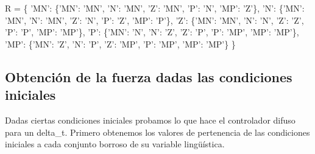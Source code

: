 \documentclass[onecolumn]{article}
\newenvironment{Shaded}{}{}
\newcommand{\NormalTok}[1]{#1}
\newcommand{\OperatorTok}[1]{\textcolor[rgb]{0.40,0.40,0.40}{#1}}
\newcommand{\StringTok}[1]{\textcolor[rgb]{0.25,0.44,0.63}{#1}}
\begin{document}
\begin{Shaded}
\begin{Highlighting}[]
\NormalTok{R }\OperatorTok{=}\NormalTok{ \{}
    \StringTok{'MN'}\NormalTok{: \{}\StringTok{'MN'}\NormalTok{: }\StringTok{'MN'}\NormalTok{, }\StringTok{'N'}\NormalTok{: }\StringTok{'MN'}\NormalTok{, }\StringTok{'Z'}\NormalTok{: }\StringTok{'MN'}\NormalTok{, }\StringTok{'P'}\NormalTok{: }\StringTok{'N'}\NormalTok{, }\StringTok{'MP'}\NormalTok{: }\StringTok{'Z'}\NormalTok{\},}
    \StringTok{'N'}\NormalTok{: \{}\StringTok{'MN'}\NormalTok{: }\StringTok{'MN'}\NormalTok{, }\StringTok{'N'}\NormalTok{: }\StringTok{'MN'}\NormalTok{, }\StringTok{'Z'}\NormalTok{: }\StringTok{'N'}\NormalTok{, }\StringTok{'P'}\NormalTok{: }\StringTok{'Z'}\NormalTok{, }\StringTok{'MP'}\NormalTok{: }\StringTok{'P'}\NormalTok{\},}
    \StringTok{'Z'}\NormalTok{: \{}\StringTok{'MN'}\NormalTok{: }\StringTok{'MN'}\NormalTok{, }\StringTok{'N'}\NormalTok{: }\StringTok{'N'}\NormalTok{, }\StringTok{'Z'}\NormalTok{: }\StringTok{'Z'}\NormalTok{, }\StringTok{'P'}\NormalTok{: }\StringTok{'P'}\NormalTok{, }\StringTok{'MP'}\NormalTok{: }\StringTok{'MP'}\NormalTok{\},}
    \StringTok{'P'}\NormalTok{: \{}\StringTok{'MN'}\NormalTok{: }\StringTok{'N'}\NormalTok{, }\StringTok{'N'}\NormalTok{: }\StringTok{'Z'}\NormalTok{, }\StringTok{'Z'}\NormalTok{: }\StringTok{'P'}\NormalTok{, }\StringTok{'P'}\NormalTok{: }\StringTok{'MP'}\NormalTok{, }\StringTok{'MP'}\NormalTok{: }\StringTok{'MP'}\NormalTok{\},}
    \StringTok{'MP'}\NormalTok{: \{}\StringTok{'MN'}\NormalTok{: }\StringTok{'Z'}\NormalTok{, }\StringTok{'N'}\NormalTok{: }\StringTok{'P'}\NormalTok{, }\StringTok{'Z'}\NormalTok{: }\StringTok{'MP'}\NormalTok{, }\StringTok{'P'}\NormalTok{: }\StringTok{'MP'}\NormalTok{, }\StringTok{'MP'}\NormalTok{: }\StringTok{'MP'}\NormalTok{\}}
\NormalTok{    \}}
\end{Highlighting}
\end{Shaded}

\hypertarget{obtenciuxf3n-de-la-fuerza-dadas-las-condiciones-iniciales}{%
\subsection{Obtención de la fuerza dadas las condiciones
iniciales}\label{obtenciuxf3n-de-la-fuerza-dadas-las-condiciones-iniciales}}

Dadas ciertas condiciones iniciales probamos lo que hace el controlador
difuso para un delta\_t. Primero obtenemos los valores de pertenencia de
las condiciones iniciales a cada conjunto borroso de su variable
lingüística.
\end{document}
